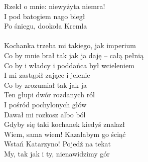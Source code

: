 \documentclass[a5paper, 10pt]{book}
\begin{document}
\begin{minipage}[t]{0.85\textwidth}
Rzekł o mnie: niewyżyta niemra!\\
I pod batogiem nago biegł\\
Po śniegu, dookoła Kremla\\
\\
Kochanka trzeba mi takiego, jak imperium\\
Co by mnie brał tak jak ja daję – całą pełnią\\
Co by i władcy i poddańca był wcieleniem\\
I mi zastąpił zające i jelenie\\
Co by zrozumiał tak jak ja\\
Ten głupi dwór rozdanych ról\\
I pośród pochylonych głów\\
Dawał mi rozkosz albo ból\\

\hspace*{5mm}Gdyby się taki kochanek kiedyś znalazł\\
\hspace*{5mm}Wiem, sama wiem! Kazałabym go ściąć\\

\hspace*{3mm}Wstań Katarzyno! Pojedź na tekat\\
\hspace*{3mm}My, tak jak i ty, nienawidzimy gór\\

\end{minipage}
\end{document}
